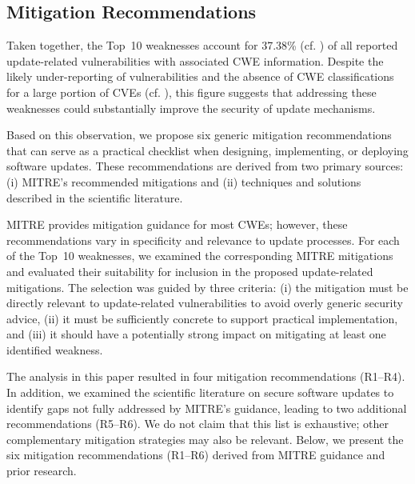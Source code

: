 \documentclass[fleqn,s1,names,tex]{neptune}
\begin{document}
\subsection{Mitigation Recommendations }






Taken together, the Top~10 weaknesses account for 37.38\% (cf. ) of all reported update-related vulnerabilities with associated CWE information. 
Despite the likely under-reporting of vulnerabilities and the absence of CWE classifications for a large portion of CVEs (cf. ), this figure suggests that addressing these weaknesses could substantially improve the security of update mechanisms.





Based on this observation, we propose  six generic mitigation recommendations that can serve as a practical checklist when designing, implementing, or deploying software updates. 
These recommendations are derived from two primary sources: (i) MITRE's recommended mitigations and (ii) techniques and solutions described in the scientific literature.




MITRE provides mitigation guidance for most CWEs; however, these recommendations vary in specificity and relevance to update processes. For each of the Top~10 weaknesses, we examined the corresponding MITRE mitigations and evaluated their suitability for inclusion in the proposed update-related mitigations.
The selection was guided by three criteria: 
(i) the mitigation must be directly relevant to update-related vulnerabilities to avoid overly generic security advice, 
(ii) it must be sufficiently concrete to support practical implementation, and 
(iii) it should have a potentially strong impact on mitigating at least one identified weakness.



The analysis in this paper resulted in four mitigation recommendations (R1--R4). 
In addition, we examined the scientific literature on secure software updates to identify gaps not fully addressed by MITRE's guidance, leading to two additional recommendations (R5--R6). 
We do not claim that this list is exhaustive; other complementary mitigation strategies may also be relevant.
Below, we present the six mitigation recommendations (R1--R6) derived from MITRE guidance and prior research.
\end{document}
